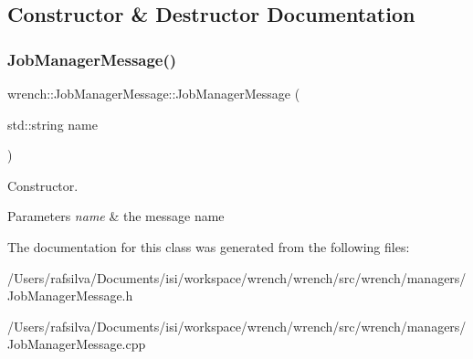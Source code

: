 \subsection{Constructor \& Destructor Documentation}
\mbox{\label{classwrench_1_1_job_manager_message_a9f5d8c99d8e2951ab0d9bdb7d82a9b04}} 
\subsubsection{\texorpdfstring{Job\+Manager\+Message()}{JobManagerMessage()}}
{\footnotesize\ttfamily wrench\+::\+Job\+Manager\+Message\+::\+Job\+Manager\+Message (\begin{DoxyParamCaption}\item[{std\+::string}]{name }\end{DoxyParamCaption})\hspace{0.3cm}{\ttfamily [protected]}}



Constructor. 


\begin{DoxyParams}{Parameters}
{\em name} & the message name \\
\hline
\end{DoxyParams}


The documentation for this class was generated from the following files\+:\begin{DoxyCompactItemize}
\item 
/\+Users/rafsilva/\+Documents/isi/workspace/wrench/wrench/src/wrench/managers/Job\+Manager\+Message.\+h\item 
/\+Users/rafsilva/\+Documents/isi/workspace/wrench/wrench/src/wrench/managers/Job\+Manager\+Message.\+cpp\end{DoxyCompactItemize}
